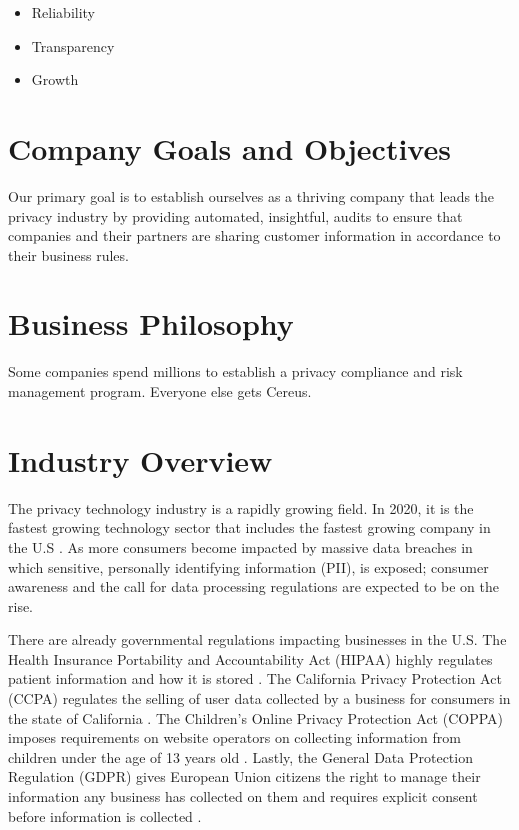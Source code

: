\begin{itemize}
  \item Reliability
  \item Transparency
  \item Growth
\end{itemize}

\section{Company Goals and Objectives}

Our primary goal is to establish ourselves as a thriving company that leads the privacy industry by providing automated, insightful, audits to ensure that companies and their partners are sharing customer information in accordance to their business rules.

\section{Business Philosophy}

Some companies spend millions to establish a privacy compliance and risk management program. Everyone else gets Cereus.

\section{Industry Overview}

The privacy technology industry is a rapidly growing field. In 2020, it is the fastest growing technology sector that includes the fastest growing company in the U.S \cite{hughes.iapp.2020}. As more consumers become impacted by massive data breaches in which sensitive, personally identifying information (PII), is exposed; consumer awareness and the call for data processing regulations are expected to be on the rise.

There are already governmental regulations impacting businesses in the U.S. The Health Insurance Portability and Accountability Act (HIPAA) highly regulates patient information and how it is stored \cite{cdc.2018}. The California Privacy Protection Act (CCPA) regulates the selling of user data collected by a business for consumers in the state of California \cite{calleg.2018}. The Children's Online Privacy Protection Act (COPPA) imposes requirements on website operators on collecting information from children under the age of 13 years old \cite{ftc.1998}. Lastly, the General Data Protection Regulation (GDPR) gives European Union citizens the right to manage their information any business has collected on them and requires explicit consent before information is collected \cite{eucomm.2016}.

